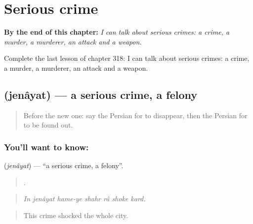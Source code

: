 
\chapter{Serious crime}
\label{ch:fa-serious-crime}

\begin{chapteropening}
\textbf{By the end of this chapter:} \emph{I can talk about serious crimes: a crime, a murder, a murderer, an attack and a weapon.}

Complete the last lesson of chapter 318: I can talk about serious crimes: a crime, a murder, a murderer, an attack and a weapon.
\end{chapteropening}

\section[\texorpdfstring{\fa{جنایت} (jenâyat)}{جنایت (jenâyat)}]{ (jenâyat) — a serious crime, a felony}

\label{lesson:FA-C318-jenayat}



\begin{quote}
Before the new one: say the Persian for to disappear, then the Persian for to be found out.
\end{quote}

\subsection*{You'll want to know: }
\textbf{} (\emph{jenâyat}) — \textquotedblleft{}a serious crime, a felony\textquotedblright{}.

\begin{quote}
      .
\end{quote}

\begin{quote}
\emph{In jenâyat hame-ye shahr râ shoke kard.}
\end{quote}

\begin{quote}
This crime shocked the whole city.
\end{quote}


